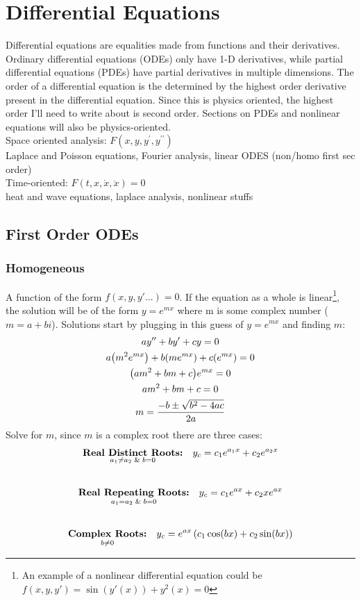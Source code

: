 \documentclass{article}
\begin{document}
\section{Differential Equations} 

Differential equations are equalities made from functions and their derivatives. Ordinary differential equations (ODEs) only have 1-D derivatives, while partial differential equations (PDEs) have partial derivatives in multiple dimensions. The order of a differential equation is the determined by the highest order derivative present in the differential equation. Since this is physics oriented, the highest order I'll need to write about is second order. Sections on PDEs and nonlinear equations will also be physics-oriented.
\\
Space oriented analysis: $F
(x,y,y^\prime,y^{\prime\prime})$\\
Laplace and Poisson equations, Fourier analysis, linear ODES (non/homo first sec order)\\
Time-oriented: $F(t,x,\dot{x},\ddot{x})=0$\\
heat and wave equations, laplace analysis, nonlinear stuffs  
\par

\subsection{First Order ODEs}
    \subsubsection{Homogeneous}
        A function of the form $f(x,y,y'...)=0$. If the equation as a whole is linear\footnote{An example of a nonlinear differential equation could be $f(x,y,y')=\sin(y'(x))+y^2(x)=0$}, 
        the solution will be of the form \(y=e^{mx}\) where m is some complex number ($m=a+bi$). Solutions start by plugging in this guess of $y=e^{mx}$ and finding $m$:
        {
        \length[0.25 cm]
        \begin{gather*}
            ay''+by'+cy=0 
            \\
            a\qty(m^2e^{m x})+b \qty(m e^{m x})+c \qty(e^{m x})=0
            \\
            \qty(am^2+b m+c)e^{mx}=0
            \\
            am^2+b m+c=0
            \\
            m=\frac{-b\pm\sqrt{b^2-4ac}}{2a}
        \end{gather*}
        }
        Solve for $m$, since $m$ is a complex root there are three cases:
        \begin{gather}
            \underset { a_1 \neq a_2\And b=0 }{\textbf{Real Distinct Roots:}}\quad y_c=c_1e^{a_1x}+c_2e^{a_2x}\\[0.7 cm]
            \underset{a_1=a_2 \And b=0 }{\textbf{Real Repeating Roots:}}\quad y_c=c_1e^{ax}+c_2xe^{ax}\\[0.7 cm]
            \underset{b \neq 0}{\textbf{Complex Roots:}}\quad y_c=e^{ax}\left(c_1\cos(bx)+c_2\sin(bx)\right)
        \end{gather}
\end{document}
